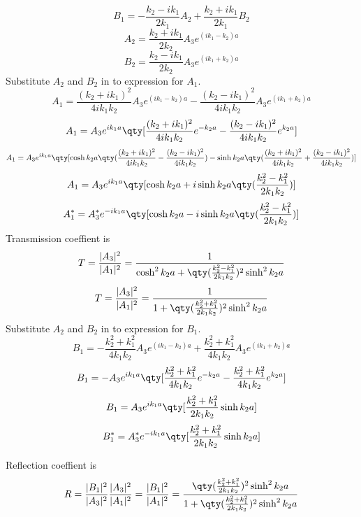 \[B_1=-\frac{k_2-ik_1}{2k_1}A_2+\frac{k_2+ik_1}{2k_1}B_2\]
\[A_2=\frac{k_2+ik_1}{2k_2}A_3e^{(ik_1-k_2)a}\]
\[B_2=\frac{k_2-ik_1}{2k_2}A_3e^{(ik_1+k_2)a}\]
Substitute $A_2$ and $B_2$ in to expression for $A_1$.\\
\[A_1=\frac{(k_2+ik_1)^2}{4ik_1k_2}A_3e^{(ik_1-k_2)a}-\frac{(k_2-ik_1)^2}{4ik_1k_2}A_3e^{(ik_1+k_2)a}\]
\[A_1=A_3e^{ik_1a}\qty[\frac{(k_2+ik_1)^2}{4ik_1k_2}e^{-k_2a}-\frac{(k_2-ik_1)^2}{4ik_1k_2}e^{k_2a}]\]
\[A_1=A_3e^{ik_1a}\qty[\cosh k_2a\qty(\frac{(k_2+ik_1)^2}{4ik_1k_2}-\frac{(k_2-ik_1)^2}{4ik_1k_2})-\sinh k_2a\qty(\frac{(k_2+ik_1)^2}{4ik_1k_2}+\frac{(k_2-ik_1)^2}{4ik_1k_2})]\]
\[A_1=A_3e^{ik_1a}\qty[\cosh k_2a+i\sinh k_2a\qty(\frac{k_2^2-k_1^2}{2k_1k_2})]\]
\[A_1^*=A_3^*e^{-ik_1a}\qty[\cosh k_2a-i\sinh k_2a\qty(\frac{k_2^2-k_1^2}{2k_1k_2})]\]
\newpage
Transmission coeffient is
\[T=\frac{|A_3|^2}{|A_1|^2}=\frac{1}{\cosh^2 k_2a+\qty(\frac{k^2_2-k^2_1}{2k_1k_2})^2\sinh^2 k_2a}\]
\[T=\frac{|A_3|^2}{|A_1|^2}=\frac{1}{1+\qty(\frac{k^2_2+k^2_1}{2k_1k_2})^2\sinh^2 k_2a}\]
Substitute $A_2$ and $B_2$ in to expression for $B_1$.\\
\[B_1=-\frac{k_2^2+k_1^2}{4k_1k_2}A_3e^{(ik_1-k_2)a}+\frac{k_2^2+k_1^2}{4k_1k_2}A_3e^{(ik_1+k_2)a}\]
\[B_1=-A_3e^{ik_1a}\qty[\frac{k_2^2+k_1^2}{4k_1k_2}e^{-k_2a}-\frac{k_2^2+k_1^2}{4k_1k_2}e^{k_2a}]\]
\[B_1=A_3e^{ik_1a}\qty[\frac{k_2^2+k_1^2}{2k_1k_2}\sinh k_2a]\]
\[B_1^*=A_3^*e^{-ik_1a}\qty[\frac{k_2^2+k_1^2}{2k_1k_2}\sinh k_2a]\]

Reflection coeffient is
\[R=\frac{|B_1|^2}{|A_3|^2}\frac{|A_3|^2}{|A_1|^2}=\frac{|B_1|^2}{|A_1|^2}=\frac{\qty(\frac{k^2_2+k^2_1}{2k_1k_2})^2\sinh^2 k_2a}{1+\qty(\frac{k^2_2+k^2_1}{2k_1k_2})^2\sinh^2 k_2a}\]
